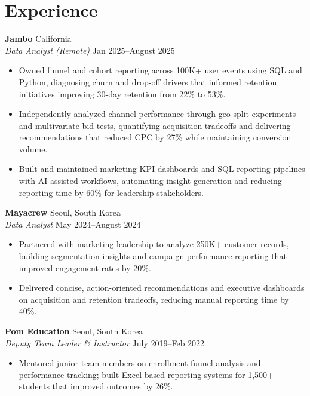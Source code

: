 \documentclass[11pt,a4paper]{article}
\begin{document}
\section*{Experience}
\noindent
\textbf{Jambo} \hfill California \\
\textit{Data Analyst (Remote)} \hfill Jan 2025--August 2025
\begin{itemize}[leftmargin=*, noitemsep, topsep=0pt]
    \item Owned funnel and cohort reporting across 100K+ user events using SQL and Python, diagnosing churn and drop-off drivers that informed retention initiatives improving 30-day retention from 22\% to 53\%.
    \item Independently analyzed channel performance through geo split experiments and multivariate bid tests, quantifying acquisition tradeoffs and delivering recommendations that reduced CPC by 27\% while maintaining conversion volume.
    \item Built and maintained marketing KPI dashboards and SQL reporting pipelines with AI-assisted workflows, automating insight generation and reducing reporting time by 60\% for leadership stakeholders.
\end{itemize}
\vspace{6pt}

\noindent
\textbf{Mayacrew} \hfill Seoul, South Korea \\
\textit{Data Analyst} \hfill May 2024--August 2024
\begin{itemize}[leftmargin=*, noitemsep, topsep=0pt]
    \item Partnered with marketing leadership to analyze 250K+ customer records, building segmentation insights and campaign performance reporting that improved engagement rates by 20\%.
    \item Delivered concise, action-oriented recommendations and executive dashboards on acquisition and retention tradeoffs, reducing manual reporting time by 40\%.
\end{itemize}
\vspace{6pt}

\noindent
\textbf{Pom Education} \hfill Seoul, South Korea \\
\textit{Deputy Team Leader \& Instructor} \hfill July 2019--Feb 2022
\begin{itemize}[leftmargin=*, noitemsep, topsep=0pt]
    \item Mentored junior team members on enrollment funnel analysis and performance tracking; built Excel-based reporting systems for 1,500+ students that improved outcomes by 26\%.
\end{itemize}
\end{document}

